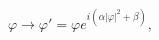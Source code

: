 \begin{equation}
\varphi\rightarrow \varphi '= \varphi e^{i(\alpha|\varphi|^2 +
\beta)}, \label{T6}
\end{equation}

